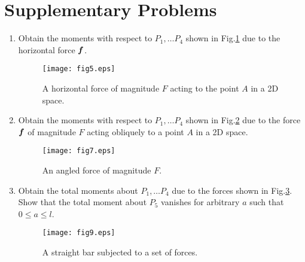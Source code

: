 \documentclass[10pt,a4j]{article}
\begin{document}
\section{Supplementary Problems}
\begin{enumerate}
\item
	Obtain the moments with respect to $P_1,\dots P_4$ shown 
	in Fig.\ref{fig:fig5} due to the horizontal force $\mbox{\boldmath $f$}$.  
	\begin{figure}[h]
		\begin{center}
		\texttt{[image: fig5.eps]} 
		\end{center}
		\caption{A horizontal force of magnitude $F$ acting to the point $A$ 
		in a 2D space.} 
		\label{fig:fig5}
	\end{figure}
\item
	Obtain the moments with respect to $P_1,\dots P_4$ shown in Fig.\ref{fig:fig7} 
	due to the force $\mbox{\boldmath $f$}$ of magnitude $F$ acting obliquely to 
	a point $A$ in a 2D space.
	\begin{figure}[h]
		\begin{center}
		\texttt{[image: fig7.eps]} 
		\end{center}
		\caption{An angled  force of magnitude $F$.} 
		\label{fig:fig7}
	\end{figure}
\item
	Obtain the total moments about $P_1,\dots P_4$ due to the 
	forces shown in Fig.\ref{fig:fig9}. Show that the total moment about 
	$P_5$ vanishes for arbitrary $a$ such that $0\leq a \leq l$.
	\begin{figure}[h]
		\begin{center}
		\texttt{[image: fig9.eps]} 
		\end{center}
		\caption{A straight bar subjected to a set of forces.} 
		\label{fig:fig9}
	\end{figure}
\end{enumerate}
\end{document}
